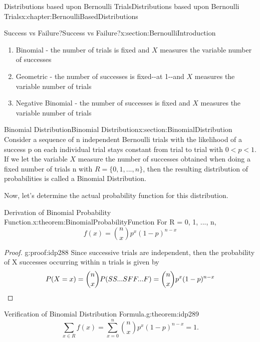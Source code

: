 \documentclass[oneside,10pt,]{book}
\newcommand{\qedhere}{\relax}
\numberwithin{equation}{section}
\newcommand{\lt}{<}
\begin{document}
\begin{chapterptx}{Distributions based upon Bernoulli Trials}{}{Distributions based upon Bernoulli Trials}{}{}{x:chapter:BernoulliBasedDistributions}
\begin{sectionptx}{Success vs Failure?}{}{Success vs Failure?}{}{}{x:section:BernoulliIntroduction}
\begin{enumerate}
\item{}Binomial - the number of trials is fixed and \(X\) measures the variable number of successes%
\item{}Geometric - the number of successes is fixed-{}-{}at 1-{}-{}and \(X\) measures the variable number of trials%
\item{}Negative Binomial - the number of successes is fixed and \(X\) measures the variable number of trials%
\end{enumerate}
%
\end{sectionptx}
%
%
\typeout{************************************************}
\typeout{************************************************}
%
\begin{sectionptx}{Binomial Distribution}{}{Binomial Distribution}{}{}{x:section:BinomialDistribution}
Consider a sequence  of n independent Bernoulli trials with the likelihood of a success p on each individual trial stays constant from trial to trial with \(0 \lt p \lt 1 \). If we let the variable \(X\) measure the number of successes obtained when doing a fixed number of trials n with \(R = \{ 0, 1, ..., n \}\), then the resulting distribution of probabilities is called a Binomial Distribution.%
\par
Now, let's determine the actual probability function for this distribution.%
\par
\begin{theorem}{Derivation of Binomial Probability Function.}{}{x:theorem:BinomialProbabilityFunction}%
For R = \textbraceleft{}0, 1, ..., n\textbraceright{},%
\begin{equation*}
f(x) = \binom{n}{x}p^x(1-p)^{n-x}
\end{equation*}
%
\end{theorem}
\begin{proof}{}{g:proof:idp288}
Since successive trials are independent, then the probability of X successes occurring within n trials is given by%
\begin{equation*}
P(X=x) = \binom{n}{x}P(SS...SFF...F) = 		
\binom{n}{x}p^x(1-p)^{n-x}\qedhere
\end{equation*}
%
\end{proof}
%
\par
\begin{theorem}{Verification of Binomial Distribution Formula.}{}{g:theorem:idp289}%
%
\begin{equation*}
\sum_{x \in R} f(x) = \sum_{x=0}^n \binom{n}{x}p^x(1-p)^{n-x} = 1.
\end{equation*}

\end{theorem}
\end{sectionptx}
\end{chapterptx}
\end{document}

